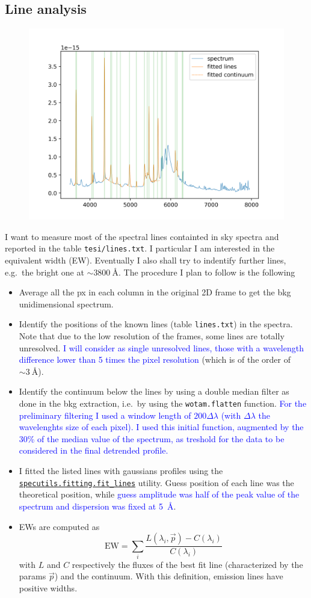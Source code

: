 \documentclass{article}
\newcommand{\arbitrario}[1]{\textcolor{blue}{#1}}
\begin{document}
\subsection{Line analysis}
	\begin{figure}[h!]
	\centering
	\includegraphics[width=.65\textwidth]{prova_fit}
\end{figure}
I want to measure most of the spectral lines containted in sky spectra and reported in the table \texttt{tesi/lines.txt}. I particular I am interested in the equivalent width (EW). Eventually I also shall try to indentify further lines, e.g.\ the bright one at $\sim\SI{3800}{\angstrom}$. The procedure I plan to follow is the following
\begin{itemize}
	\item Average all the px in each column in the original 2D frame to get the bkg unidimensional spectrum.
	\item Identify the positions of the known lines (table \texttt{lines.txt}) in the spectra. Note that due to the low resolution of the frames, some lines are totally unresolved. \arbitrario{I will consider as single unresolved lines, those with a wavelength difference lower than 5 times the pixel resolution} (which is of the order of $\sim\SI{3}{\angstrom}$).
	\item Identify the continuum below the lines by using a double median filter as done in the bkg extraction, i.e.\ by using the \texttt{wotam.flatten} function. \arbitrario{For the preliminary filtering I used a window length of $200\Delta\lambda$ (with $\Delta\lambda$ the wavelenghts size of each pixel). I used this initial function, augmented by the 30\% of the median value of the spectrum, as treshold for the data to be considered in the final detrended profile.}
	\item I fitted the listed lines with gaussians profiles using the \href{https://specutils.readthedocs.io/en/stable/fitting.html}{\texttt{specutils.fitting.fit\_lines}} utility. Guess position of each line was the theoretical position, while \arbitrario{guess amplitude was half of the peak value of the spectrum and dispersion was fixed at \SI{5}{\angstrom}}.
	\item EWs are computed as
	\[ \text{EW} = \sum_i \frac{L(\lambda_i,\vec p)-C(\lambda_i)}{C(\lambda_i)}\]
	with $L$ and $C$ respectively the fluxes of the best fit line (characterized by the params $\vec p$) and the continuum. With this definition, emission lines have positive widths.
\end{itemize}
\end{document}
